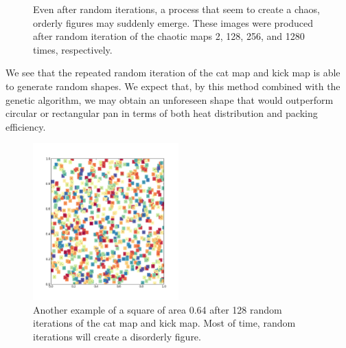 \documentclass[12pt,draft]{reedmcm}
\begin{document}
\begin{figure}[h!]
  \caption{Even after random iterations, a process that seem to create a chaos, orderly figures may suddenly emerge.
  These images were produced after random iteration of the chaotic maps 2, 128, 256, and 1280 times, respectively.}
  \label{fig:order}
\end{figure}
%
We see that the repeated random iteration of the cat map and kick map is able to generate random shapes.
We expect that, by this method combined with the genetic algorithm, we may obtain an unforeseen shape that would outperform circular or rectangular pan in terms of both heat distribution and packing efficiency.
\begin{figure}[h!]
  \centering
  \includegraphics[width=0.5\textwidth]{chaotic_shape}
  \caption{Another example of a square of area 0.64 after 128 random iterations of the cat map and kick map.
  Most of time, random iterations will create a disorderly figure.
  }
  \label{fig:chaotic}
\end{figure}
\end{document}
